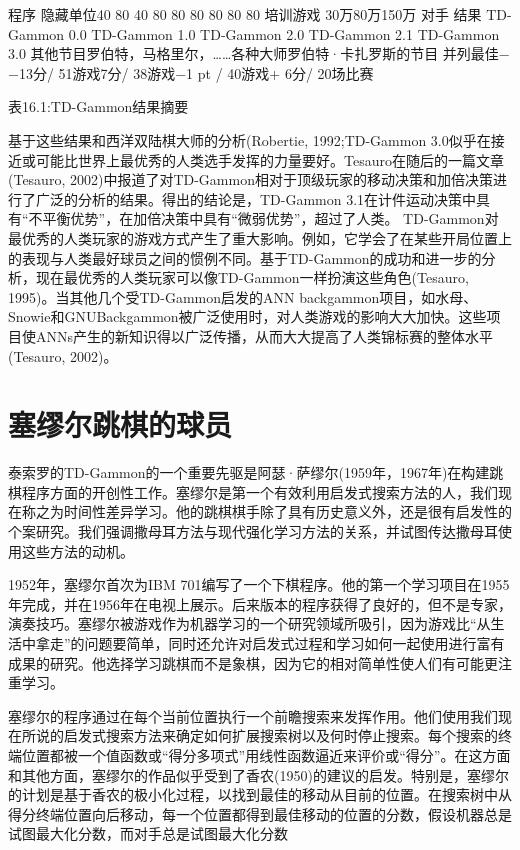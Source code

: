 程序	隐藏单位40 80 40 80 80 80 80 80 80	培训游戏
30万80万150万	对手	结果
TD-Gammon 0.0 TD-Gammon 1.0 TD-Gammon 2.0 TD-Gammon 2.1 TD-Gammon 3.0			其他节目罗伯特，马格里尔，……各种大师罗伯特·卡扎罗斯的节目	并列最佳−−13分/ 51游戏7分/ 38游戏−1 pt / 40游戏+ 6分/ 20场比赛

表16.1:TD-Gammon结果摘要

基于这些结果和西洋双陆棋大师的分析(Robertie, 1992;TD-Gammon 3.0似乎在接近或可能比世界上最优秀的人类选手发挥的力量要好。Tesauro在随后的一篇文章(Tesauro, 2002)中报道了对TD-Gammon相对于顶级玩家的移动决策和加倍决策进行了广泛的分析的结果。得出的结论是，TD-Gammon 3.1在计件运动决策中具有“不平衡优势”，在加倍决策中具有“微弱优势”，超过了人类。
TD-Gammon对最优秀的人类玩家的游戏方式产生了重大影响。例如，它学会了在某些开局位置上的表现与人类最好球员之间的惯例不同。基于TD-Gammon的成功和进一步的分析，现在最优秀的人类玩家可以像TD-Gammon一样扮演这些角色(Tesauro, 1995)。当其他几个受TD-Gammon启发的ANN backgammon项目，如水母、Snowie和GNUBackgammon被广泛使用时，对人类游戏的影响大大加快。这些项目使ANNs产生的新知识得以广泛传播，从而大大提高了人类锦标赛的整体水平(Tesauro, 2002)。


\section{塞缪尔跳棋的球员}

泰索罗的TD-Gammon的一个重要先驱是阿瑟·萨缪尔(1959年，1967年)在构建跳棋程序方面的开创性工作。塞缪尔是第一个有效利用启发式搜索方法的人，我们现在称之为时间性差异学习。他的跳棋棋手除了具有历史意义外，还是很有启发性的个案研究。我们强调撒母耳方法与现代强化学习方法的关系，并试图传达撒母耳使用这些方法的动机。

1952年，塞缪尔首次为IBM 701编写了一个下棋程序。他的第一个学习项目在1955年完成，并在1956年在电视上展示。后来版本的程序获得了良好的，但不是专家，演奏技巧。塞缪尔被游戏作为机器学习的一个研究领域所吸引，因为游戏比“从生活中拿走”的问题要简单，同时还允许对启发式过程和学习如何一起使用进行富有成果的研究。他选择学习跳棋而不是象棋，因为它的相对简单性使人们有可能更注重学习。

塞缪尔的程序通过在每个当前位置执行一个前瞻搜索来发挥作用。他们使用我们现在所说的启发式搜索方法来确定如何扩展搜索树以及何时停止搜索。每个搜索的终端位置都被一个值函数或“得分多项式”用线性函数逼近来评价或“得分”。在这方面和其他方面，塞缪尔的作品似乎受到了香农(1950)的建议的启发。特别是，塞缪尔的计划是基于香农的极小化过程，以找到最佳的移动从目前的位置。在搜索树中从得分终端位置向后移动，每一个位置都得到最佳移动的位置的分数，假设机器总是试图最大化分数，而对手总是试图最大化分数

